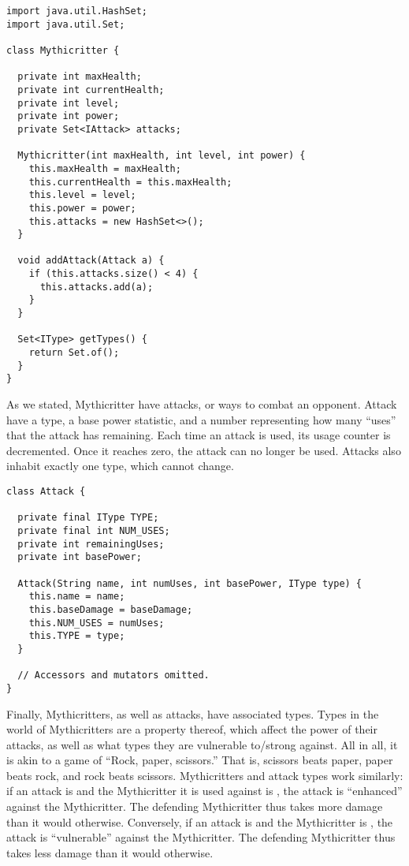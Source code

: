 \begin{lstlisting}[language=MyJava]
import java.util.HashSet;
import java.util.Set; 

class Mythicritter {
  
  private int maxHealth;
  private int currentHealth;
  private int level;
  private int power;
  private Set<IAttack> attacks;

  Mythicritter(int maxHealth, int level, int power) {
    this.maxHealth = maxHealth;
    this.currentHealth = this.maxHealth;
    this.level = level;
    this.power = power;
    this.attacks = new HashSet<>();
  }

  void addAttack(Attack a) { 
    if (this.attacks.size() < 4) {
      this.attacks.add(a);
    }
  }

  Set<IType> getTypes() {
    return Set.of();
  }
}
\end{lstlisting}

As we stated, Mythicritter have attacks, or ways to combat an opponent. 
Attack have a type, a base power statistic, and a number representing how many ``uses'' that the attack has remaining. 
Each time an attack is used, its usage counter is decremented. 
Once it reaches zero, the attack can no longer be used. Attacks also inhabit exactly one type, which cannot change.

\enlargethispage{-6\baselineskip}
\begin{lstlisting}[language=MyJava]
class Attack {

  private final IType TYPE;
  private final int NUM_USES;
  private int remainingUses;
  private int basePower;

  Attack(String name, int numUses, int basePower, IType type) {
    this.name = name;
    this.baseDamage = baseDamage;
    this.NUM_USES = numUses;
    this.TYPE = type;
  }

  // Accessors and mutators omitted.
}
\end{lstlisting}

Finally, Mythicritters, as well as attacks, have associated types. 
Types in the world of Mythicritters are a property thereof, which affect the power of their attacks, as well as what types they are vulnerable to/strong against. 
All in all, it is akin to a game of ``Rock, paper, scissors.'' 
That is, scissors beats paper, paper beats rock, and rock beats scissors. Mythicritters and attack types work similarly: if an attack is  and the Mythicritter it is used against is , the attack is ``enhanced'' against the Mythicritter. 
The defending Mythicritter thus takes more damage than it would otherwise. 
Conversely, if an attack is  and the Mythicritter is , the attack is ``vulnerable'' against the Mythicritter. 
The defending Mythicritter thus takes less damage than it would otherwise. 


